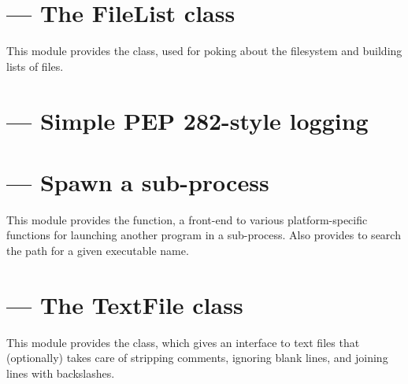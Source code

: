 \documentclass{manual}
\begin{document}
\section{ --- The FileList class}

This module provides the  class, used for poking about
the filesystem and building lists of files.


\section{ --- Simple PEP 282-style logging}




\section{ --- Spawn a sub-process}

This module provides the  function, a front-end to 
various platform-specific functions for launching another program in a 
sub-process.
Also provides  to search the path for a given
executable name.





\section{ --- The TextFile class}

This module provides the  class, which gives an interface 
to text files that (optionally) takes care of stripping comments, ignoring 
blank lines, and joining lines with backslashes.
\end{document}

